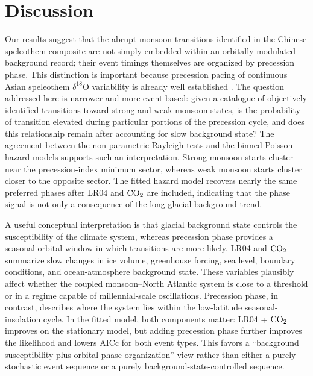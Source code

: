 \documentclass[11pt]{article}
\begin{document}
\section*{Discussion}

Our results suggest that the abrupt monsoon transitions identified in the Chinese speleothem composite are not simply embedded within an orbitally modulated background record; their event timings themselves are organized by precession phase. This distinction is important because precession pacing of continuous Asian speleothem \(\delta^{18}\mathrm{O}\) variability is already well established \citep{wang2008, cheng2016}. The question addressed here is narrower and more event-based: given a catalogue of objectively identified transitions toward strong and weak monsoon states, is the probability of transition elevated during particular portions of the precession cycle, and does this relationship remain after accounting for slow background state? The agreement between the non-parametric Rayleigh tests and the binned Poisson hazard models supports such an interpretation. Strong monsoon starts cluster near the precession-index minimum sector, whereas weak monsoon starts cluster closer to the opposite sector. The fitted hazard model recovers nearly the same preferred phases after LR04 and \(\ce{CO2}\) are included, indicating that the phase signal is not only a consequence of the long glacial background trend.

A useful conceptual interpretation is that glacial background state controls the susceptibility of the climate system, whereas precession phase provides a seasonal-orbital window in which transitions are more likely. LR04 and \(\ce{CO2}\) summarize slow changes in ice volume, greenhouse forcing, sea level, boundary conditions, and ocean-atmosphere background state. These variables plausibly affect whether the coupled monsoon--North Atlantic system is close to a threshold or in a regime capable of millennial-scale oscillations. Precession phase, in contrast, describes where the system lies within the low-latitude seasonal-insolation cycle. In the fitted model, both components matter: LR04 + \(\ce{CO2}\) improves on the stationary model, but adding precession phase further improves the likelihood and lowers AICc for both event types. This favors a ``background susceptibility plus orbital phase organization'' view rather than either a purely stochastic event sequence or a purely background-state-controlled sequence.
\end{document}
